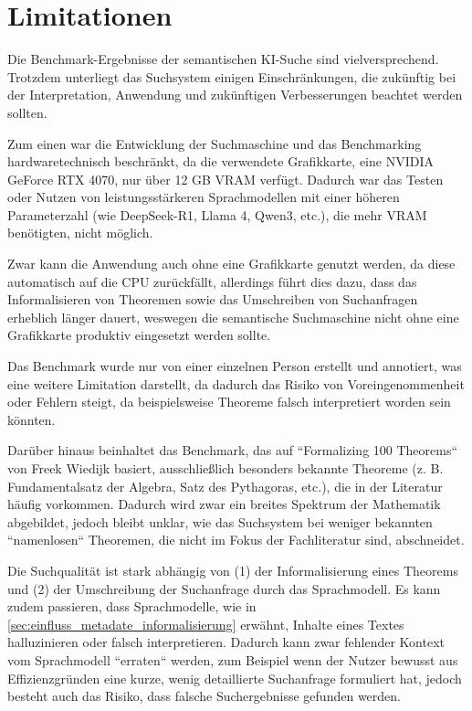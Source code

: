 \documentclass[12pt,letterpaper]{article} %
\begin{document}
\section{Limitationen}

Die Benchmark-Ergebnisse der semantischen KI-Suche sind vielversprechend. Trotzdem unterliegt das Suchsystem einigen Einschränkungen, die zukünftig bei der Interpretation, Anwendung und zukünftigen Verbesserungen beachtet werden sollten.

Zum einen war die Entwicklung der Suchmaschine und das Benchmarking hardwaretechnisch beschränkt, da die verwendete Grafikkarte, eine NVIDIA GeForce RTX 4070, nur über 12 GB VRAM verfügt.
Dadurch war das Testen oder Nutzen von leistungsstärkeren Sprachmodellen mit einer höheren Parameterzahl (wie DeepSeek-R1, Llama 4, Qwen3, etc.), die mehr VRAM benötigten, nicht möglich.

Zwar kann die Anwendung auch ohne eine Grafikkarte genutzt werden, da diese automatisch auf die CPU zurückfällt, allerdings führt dies dazu, dass das Informalisieren von Theoremen sowie das Umschreiben von Suchanfragen erheblich länger dauert, weswegen die semantische Suchmaschine nicht ohne eine Grafikkarte produktiv eingesetzt werden sollte.

Das Benchmark wurde nur von einer einzelnen Person erstellt und annotiert, was eine weitere Limitation darstellt, da dadurch das Risiko von Voreingenommenheit oder Fehlern steigt, da beispielsweise Theoreme falsch interpretiert worden sein könnten.

Darüber hinaus beinhaltet das Benchmark, das auf ``Formalizing 100 Theorems`` von Freek Wiedijk basiert, ausschließlich besonders bekannte Theoreme (z. B. Fundamentalsatz der Algebra, Satz des Pythagoras, etc.), die in der Literatur häufig vorkommen.
Dadurch wird zwar ein breites Spektrum der Mathematik abgebildet, jedoch bleibt unklar, wie das Suchsystem bei weniger bekannten ``namenlosen`` Theoremen, die nicht im Fokus der Fachliteratur sind, abschneidet.

Die Suchqualität ist stark abhängig von (1) der Informalisierung eines Theorems und (2) der Umschreibung der Suchanfrage durch das Sprachmodell.
Es kann zudem passieren, dass Sprachmodelle, wie in \ref{sec:einfluss_metadate_informalisierung} erwähnt, Inhalte eines Textes halluzinieren oder falsch interpretieren.
Dadurch kann zwar fehlender Kontext vom Sprachmodell ``erraten`` werden, zum Beispiel wenn der Nutzer bewusst aus Effizienzgründen eine kurze, wenig detaillierte Suchanfrage formuliert hat, jedoch besteht auch das Risiko, dass falsche Suchergebnisse gefunden werden.
\end{document}
